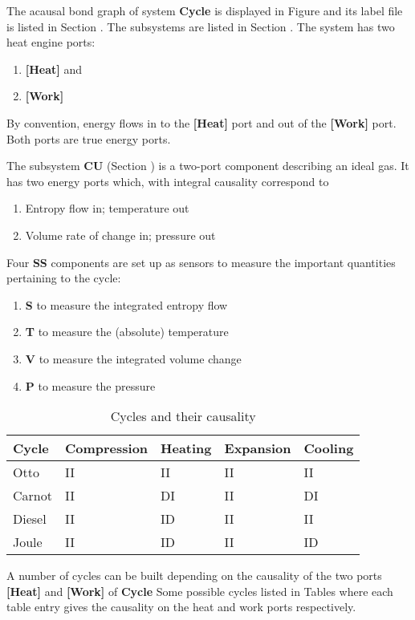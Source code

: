 
%

   The acausal bond graph of system \textbf{Cycle} is
   displayed in Figure  and its label
   file is listed in Section .
   The subsystems are listed in Section .
The system has two heat engine ports: 
\begin{enumerate}
\item \textbf{[Heat]} and
\item \textbf{[Work]}
\end{enumerate}
By convention, energy flows in to the \textbf{[Heat]} port and out of
the \textbf{[Work]} port. Both ports are true energy ports.


The subsystem \textbf{CU} (Section ) is a two-port
component describing an ideal gas. It has two energy ports which, with
integral causality correspond to
\begin{enumerate}
\item Entropy flow in; temperature out
\item Volume rate of change in; pressure out
\end{enumerate}

Four \textbf{SS} components are set up as sensors to measure the
important quantities pertaining to the cycle:
\begin{enumerate}
\item \textbf{S} to measure the integrated entropy flow
\item \textbf{T} to measure the (absolute) temperature
\item \textbf{V} to measure the integrated volume change
\item \textbf{P} to measure the pressure
\end{enumerate}

   \begin{table}[htbp]
     \begin{center}
       \leavevmode
       \begin{tabular}{|l|l|l|l|l|}
         \hline
         Cycle & Compression & Heating & Expansion & Cooling \\
         \hline
         Otto & II & II & II & II \\
         Carnot & II & DI & II & DI \\
         Diesel & II & ID & II & II \\
         Joule & II & ID & II & ID \\
         \hline
       \end{tabular}
       \caption{Cycles and their causality}
       \label{tab:cycles}
     \end{center}
   \end{table}
   
   A number of cycles can be built depending on the causality of the
   two ports \textbf{[Heat]} and \textbf{[Work]} of \textbf{Cycle}
   Some possible cycles listed in Tables  where each
   table entry gives the causality on the heat and work ports
   respectively.

